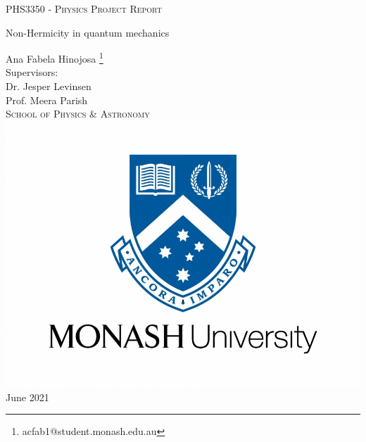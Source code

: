 \documentclass[10pt, a4paper, singlespacing, headsepline]{report}
\begin{document}
\begin{titlepage}
\begin{center}


\vspace{0.5cm}
\textsc{PHS3350 - Physics Project Report} \\
\vspace{2.5cm}

{\Huge Non-Hermicity in quantum mechanics}
\vspace{3cm}

{\LARGE Ana Fabela Hinojosa \footnote{acfab1@student.monash.edu.au}} \\
\vspace{0.4cm}
{\Large Supervisors:\\ Dr. Jesper Levinsen \\ Prof. Meera Parish \\}
\textsc{School of Physics \& Astronomy} \\
\vspace{3cm}
\includegraphics[scale=0.2]{logo.jpg} \\ %
\vspace{3cm}
{\LARGE June 2021}\\
\vspace{0.5cm}
\end{center}
\end{titlepage}

\end{document}

